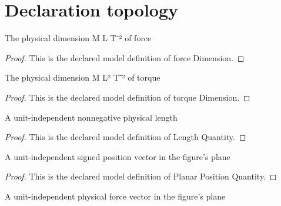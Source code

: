 \section{Declaration topology}
\begin{definition}
  \label{def:physics:phyx-mini-0707:phyxminiproblems-problemphyxmini0707-forcedimension}
  The physical dimension M L T⁻² of force
\end{definition}
\begin{proof}
  This is the declared model definition of force Dimension.
\end{proof}
\begin{definition}
  \label{def:physics:phyx-mini-0707:phyxminiproblems-problemphyxmini0707-torquedimension}
  The physical dimension M L² T⁻² of torque
\end{definition}
\begin{proof}
  This is the declared model definition of torque Dimension.
\end{proof}
\begin{definition}
  \label{def:physics:phyx-mini-0707:phyxminiproblems-problemphyxmini0707-lengthquantity}
  A unit-independent nonnegative physical length
\end{definition}
\begin{proof}
  This is the declared model definition of Length Quantity.
\end{proof}
\begin{definition}
  \label{def:physics:phyx-mini-0707:phyxminiproblems-problemphyxmini0707-planarpositionquantity}
  A unit-independent signed position vector in the figure's plane
\end{definition}
\begin{proof}
  This is the declared model definition of Planar Position Quantity.
\end{proof}
\begin{definition}
  \label{def:physics:phyx-mini-0707:phyxminiproblems-problemphyxmini0707-planarforcequantity}
  A unit-independent physical force vector in the figure's plane
\end{definition}
